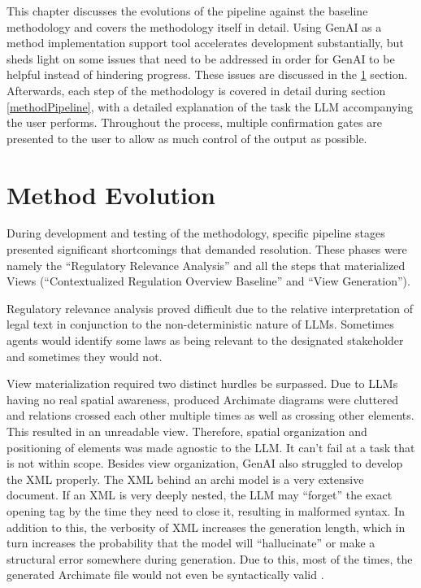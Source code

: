 \label{chap:methd}

This chapter discusses the evolutions of the pipeline against the baseline methodology and covers the methodology itself in detail. Using \ac{GenAI} as a method implementation support tool accelerates development substantially, but sheds light on some issues that need to be addressed in order for \ac{GenAI} to be helpful instead of hindering progress. These issues are discussed in the \ref{MethodEvo} section. Afterwards, each step of the methodology is covered in detail during section \ref{methodPipeline}, with a detailed explanation of the task the \ac{LLM} accompanying the user performs. Throughout the process, multiple confirmation gates are presented to the user to allow as much control of the output as possible.

\section{Method Evolution} 
\label{MethodEvo}

During development and testing of the methodology, specific pipeline stages presented significant shortcomings that demanded resolution. These phases were namely the ``Regulatory Relevance Analysis'' and all the steps that materialized Views (``Contextualized Regulation Overview Baseline'' and ``View Generation''). 

Regulatory relevance analysis proved difficult due to the relative interpretation of legal text in conjunction to the non-deterministic nature of \ac{LLM}s. Sometimes agents would identify some laws as being relevant to the designated stakeholder and sometimes they would not. 

View materialization required two distinct hurdles be surpassed. Due to \ac{LLM}s having no real spatial awareness, produced Archimate diagrams were cluttered and relations crossed each other multiple times as well as crossing other elements. This resulted in an unreadable view. Therefore, spatial organization and positioning of elements was made agnostic to the \ac{LLM}. It can't fail at a task that is not within scope.
Besides view organization, \ac{GenAI} also struggled to develop the \ac{XML} properly. The \ac{XML} behind an archi model is a very extensive document. If an \ac{XML} is very deeply nested, the \ac{LLM} may ``forget'' the exact opening tag by the time they need to close it, resulting in malformed syntax. In addition to this, the verbosity of \ac{XML} increases the generation length, which in turn increases the probability that the model will ``hallucinate'' or make a structural error somewhere during generation. Due to this, most of the times, the generated Archimate file would not even be syntactically valid .

